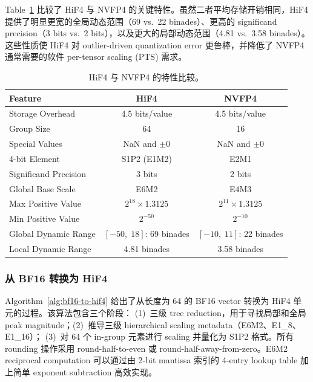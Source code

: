 \documentclass{article}
\begin{document}
Table~\ref{tab:hif4-vs-nvfp4} 比较了 HiF4 与 NVFP4 的关键特性。虽然二者平均存储开销相同，HiF4
提供了明显更宽的全局动态范围（69 vs.\ 22 binades）、更高的 significand precision（3 bits vs.\ 2 bits），以及更大的局部动态范围（4.81 vs.\ 3.58 binades）。这些性质使
HiF4 对 outlier-driven quantization error 更鲁棒，并降低了 NVFP4 通常需要的软件 per-tensor scaling (PTS) 需求。

\begin{table}[h]
\caption{HiF4 与 NVFP4 的特性比较。}
\label{tab:hif4-vs-nvfp4}
\centering
\small
\begin{tabular}{@{}lcc@{}}
\toprule
Feature & HiF4 & NVFP4 \\
\midrule
Storage Overhead       & 4.5 bits/value & 4.5 bits/value \\
Group Size             & 64             & 16 \\
Special Values         & NaN and $\pm 0$ & NaN and $\pm 0$ \\
4-bit Element          & S1P2 (E1M2)   & E2M1 \\
Significand Precision  & 3 bits         & 2 bits \\
Global Base Scale      & E6M2           & E4M3 \\
Max Positive Value     & $2^{18} \times 1.3125$ & $2^{11} \times 1.3125$ \\
Min Positive Value     & $2^{-50}$      & $2^{-10}$ \\
Global Dynamic Range   & $[-50,\;18]$: 69 binades & $[-10,\;11]$: 22 binades \\
Local Dynamic Range    & 4.81 binades   & 3.58 binades \\
\bottomrule
\end{tabular}
\end{table}

\subsubsection{从 BF16 转换为 HiF4}

Algorithm~\ref{alg:bf16-to-hif4} 给出了从长度为 64 的 BF16 vector 转换为 HiF4 单元的过程。该算法包含三个阶段：
(1)~三级 tree reduction，用于寻找局部和全局 peak magnitude；(2)~推导三级 hierarchical scaling metadata（E6M2、E1\_8、E1\_16）；
(3)~对 64 个 in-group 元素进行 scaling 并量化为 S1P2 格式。所有 rounding 操作采用 round-half-to-even 或
round-half-away-from-zero。E6M2 reciprocal computation 可以通过由 2-bit mantissa 索引的 4-entry lookup table
加上简单 exponent subtraction 高效实现。
\end{document}
